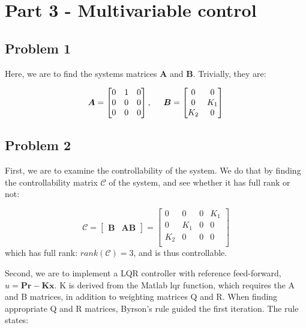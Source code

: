 \section{Part 3 - Multivariable control}
\subsection{Problem 1}
Here, we are to find the systems matrices $\boldsymbol{A}$ and
$\boldsymbol{B}$. Trivially, they are:

\begin{equation}
  \boldsymbol{A} = \begin{bmatrix}
    0 & 1 & 0 \\
    0 & 0 & 0 \\
    0 & 0 & 0 \\
  \end{bmatrix}, \hspace{0.5cm}
  \boldsymbol{B} = \begin{bmatrix}
    0 & 0 \\
    0 & K_1 \\
    K_2 & 0 \\
  \end{bmatrix}
\end{equation}

\subsection{Problem 2}
First, we are to examine the controllability of the system. We do that
by finding the controllability matrix $\boldsymbol{\mathcal{C}}$ of
the system, and see whether it has full rank or not:

\begin{equation}
  \boldsymbol{\mathcal{C}} = \begin{bmatrix}
    \boldsymbol{B} & \boldsymbol{AB}
  \end{bmatrix}
  =
  \begin{bmatrix}
    0 & 0 & 0 & K_1 \\
    0 & K_1 & 0 & 0 \\
    K_2 & 0 & 0 & 0 \\
  \end{bmatrix}
\end{equation}
which has full rank: $rank(\bm{\mathcal{C}}) = 3$, and is thus
controllable.

Second, we are to implement a LQR controller with reference feed-forward, $u = \bm{Pr}-\bm{Kx}$. K is derived from the Matlab lqr function, which requires the A and B matrices, in addition to weighting matrices Q and R. When finding appropriate Q and R matrices, Byrson's rule guided the first iteration. The rule states:

